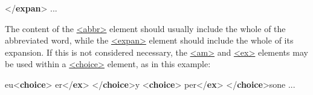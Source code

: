 \begin{shaded}
{</\textbf{expan}>} ... \end{shaded}\egroup\par \noindent  The content of the \hyperref[TEI.abbr]{<abbr>} element should usually include the whole of the abbreviated word, while the \hyperref[TEI.expan]{<expan>} element should include the whole of its expansion. If this is not considered necessary, the \hyperref[TEI.am]{<am>} and \hyperref[TEI.ex]{<ex>} elements may be used within a \hyperref[TEI.choice]{<choice>} element, as in this example: \par\bgroup{}\exampleFont \begin{shaded}\noindent\mbox{}eu{<\textbf{choice}>}\mbox{}\newline 
{}\mbox{}\newline 
\hspace*{1em}\mbox{}\newline 
{}\mbox{}\newline 
{}er{</\textbf{ex}>}\mbox{}\newline 
{</\textbf{choice}>}y {<\textbf{choice}>}\mbox{}\newline 
{}\mbox{}\newline 
\hspace*{1em}\mbox{}\newline 
{}\mbox{}\newline 
{}per{</\textbf{ex}>}\mbox{}\newline 
{</\textbf{choice}>}sone ... \end{shaded}\egroup\par \par
